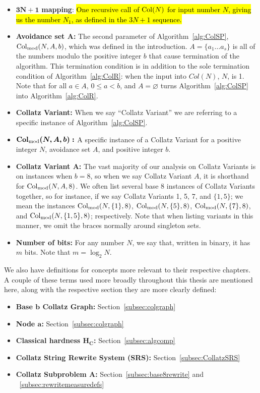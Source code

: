 \begin{itemize}
    \item $\boldsymbol{3N+1}$\textbf{ mapping}: \hl{One recursive call of $\mathrm{Col}(N)$ for input number $N$, giving us the number $N_1$, as defined in the $3N+1$ sequence.}
    \item \textbf{Avoidance set $\boldsymbol A$:} The second parameter of Algorithm~\ref{alg:ColSP}, $\mathrm{Col}_{\text{mod}}(N,A,b)$, which was defined in the introduction. $A = \{a_1 \ldots a_s\}$ is all of the numbers modulo the positive integer $b$ that cause termination of the algorithm. This termination condition is in addition to the sole termination condition of Algorithm~\ref{alg:ColR}: when the input into $Col(N)$, $N$, is 1. Note that for all $a \in A$, $0 \le a < b$, and $A = \varnothing$ turns Algorithm~\ref{alg:ColSP} into Algorithm~\ref{alg:ColR}.
    \item \textbf{Collatz Variant:} When we say ``Collatz Variant'' we are referring to a specific instance of Algorithm~\ref{alg:ColSP}.
    \item $\boldsymbol{\mathrm{Col}_{\text{mod}}(N,A,b):}$ A specific instance of a Collatz Variant for a positive integer $N$, avoidance set $A$, and positive integer $b$. 
    \item \textbf{Collatz Variant A:} The vast majority of our analysis on Collatz Variants is on instances when $b = 8$, so when we say Collatz Variant $A$, it is shorthand for $\mathrm{Col}_{\text{mod}}(N,A,8)$. We often list several base 8 instances of Collatz Variants together, so for instance, if we say Collatz Variants 1, 5, 7, and $\{1,5\}$; we mean the instances $\mathrm{Col}_{\text{mod}}(N,\{1\},8)$, $\mathrm{Col}_{\text{mod}}(N,\{5\},8)$, $\mathrm{Col}_{\text{mod}}(N,\{7\},8)$, and $\mathrm{Col}_{\text{mod}}(N,\{1,5\},8)$; respectively. Note that when listing variants in this manner, we omit the braces normally around singleton sets.
\item \textbf{Number of bits:} For any number $N$, we say that, written in binary, it has $m$ bits. Note that $m = \log_2{N}$.
\end{itemize}
We also have definitions for concepts more relevant to their respective chapters. A couple of these terms used more broadly throughout this thesis are mentioned here, along with the respective section they are more clearly defined:
\begin{itemize}
\item \textbf{Base $\boldsymbol b$ Collatz Graph:} Section~\ref{subsec:colgraph}
\item \textbf{Node $\boldsymbol a$:} Section~\ref{subsec:colgraph}
\item \textbf{Classical hardness $\boldsymbol {H_C}$:} Section~\ref{subsec:algcomp}
\item \textbf{Collatz String Rewrite System (SRS):} Section~\ref{subsec:CollatzSRS}
\item \textbf{Collatz Subproblem $\boldsymbol A$:} Section~\ref{subsec:base8rewrite} and ~\ref{subsec:rewritemeasuredefs} 
\end{itemize}
%

